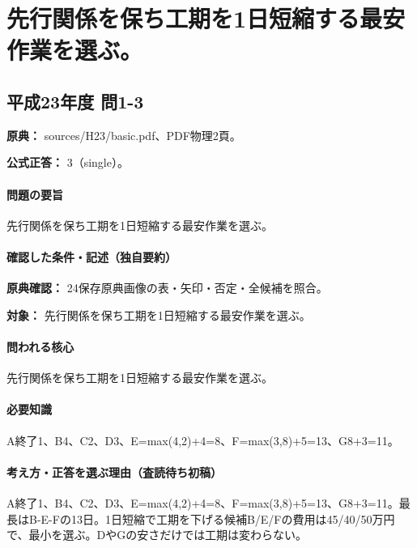 \section{先行関係を保ち工期を1日短縮する最安作業を選ぶ。}

\subsection{平成23年度 問1-3}
\label{q:h23-reg-basic-1-3}

\noindent\textbf{原典：} sources/H23/basic.pdf、PDF物理2頁。

\textbf{公式正答：} 3（single）。

\paragraph{問題の要旨} 先行関係を保ち工期を1日短縮する最安作業を選ぶ。

\paragraph{確認した条件・記述（独自要約）}\mbox{}\par

\noindent\textbf{原典確認：} 24保存原典画像の表・矢印・否定・全候補を照合。\par

\noindent\textbf{対象：} 先行関係を保ち工期を1日短縮する最安作業を選ぶ。\par

\paragraph{問われる核心} 先行関係を保ち工期を1日短縮する最安作業を選ぶ。

\paragraph{必要知識} A終了1、B4、C2、D3、E=\allowbreak{}max(4,2)+4=\allowbreak{}8、F=\allowbreak{}max(3,8)+5=\allowbreak{}13、G8+3=\allowbreak{}11。

\paragraph{考え方・正答を選ぶ理由（査読待ち初稿）} A終了1、B4、C2、D3、E=\allowbreak{}max(4,2)+4=\allowbreak{}8、F=\allowbreak{}max(3,8)+5=\allowbreak{}13、G8+3=\allowbreak{}11。最長はB-E-Fの13日。1日短縮で工期を下げる候補B/E/Fの費用は45/40/50万円で、最小を選ぶ。DやGの安さだけでは工期は変わらない。


